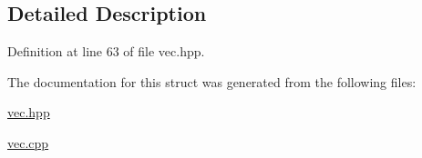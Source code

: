 \subsection{Detailed Description}


Definition at line 63 of file vec.\-hpp.



The documentation for this struct was generated from the following files\-:\begin{DoxyCompactItemize}
\item 
\hyperlink{vec_8hpp}{vec.\-hpp}\item 
\hyperlink{vec_8cpp}{vec.\-cpp}\end{DoxyCompactItemize}
